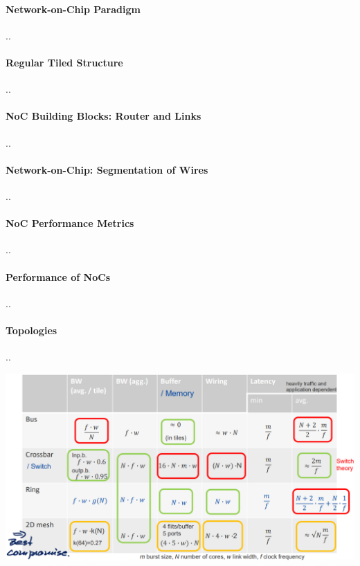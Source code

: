 \documentclass[fontsize=8pt]{scrartcl}
\begin{document}
\begin{multicols*}{4}
\paragraph{Network-on-Chip Paradigm} ..

\paragraph{Regular Tiled Structure}..

\paragraph{NoC Building Blocks: Router and Links}..

\paragraph{Network-on-Chip: Segmentation of Wires}..

\paragraph{NoC Performance Metrics}..

\paragraph{Performance of NoCs}..

\paragraph{Topologies}..

\begin{center}
  \includegraphics[width=\linewidth]{img/interconnect_summary.png}
  \label{fig:interconnect_summary}
\end{center}


\end{multicols*}
\end{document}
